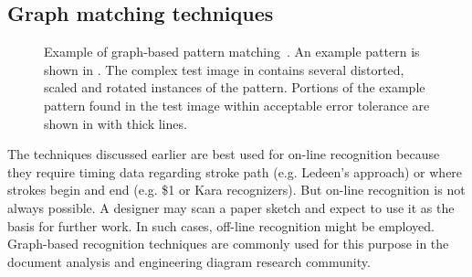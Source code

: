 \subsection{Graph matching techniques}
\label{sec:recognition-graph}

\begin{figure}
\begin{center}
\caption{Example of graph-based pattern matching~\cite{llados-rag}. An
  example pattern is shown in . The complex
  test image in  contains several
  distorted, scaled and rotated instances of the pattern. Portions of
  the example pattern found in the test image within acceptable error
  tolerance are shown in  with thick
  lines.}
\label{fig:llados-graph}
\end{center}
\end{figure}

The techniques discussed earlier are best used for on-line recognition
because they require timing data regarding stroke path (e.g. Ledeen's
approach) or where strokes begin and end (e.g. \$1 or Kara
recognizers). But on-line recognition is not always possible. A
designer may scan a paper sketch and expect to use it as the basis for
further work. In such cases, off-line recognition might be
employed. Graph-based recognition techniques are commonly used for
this purpose in the document analysis and engineering diagram research
community.

